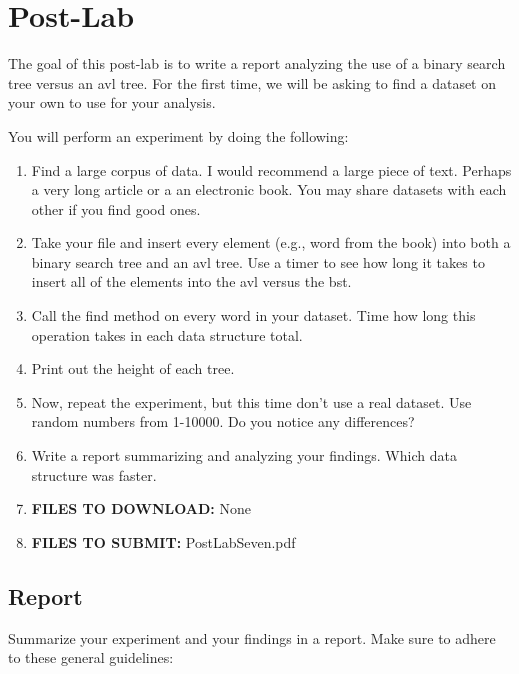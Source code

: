 \documentclass[paper=a4, fontsize=11pt, parskip=full]{scrartcl} %
\numberwithin{equation}{section} %
\numberwithin{figure}{section} %
\numberwithin{table}{section} %
\begin{document}
\newpage
\section{Post-Lab}

The goal of this post-lab is to write a report analyzing the use of a binary search tree versus an avl tree. For the first time, we will be asking to find a dataset on your own to use for your analysis. 

You will perform an experiment by doing the following:

\begin{enumerate}
	\item Find a large corpus of data. I would recommend a large piece of text. Perhaps a very long article or a an electronic book. You may share datasets with each other if you find good ones.
	\item Take your file and insert every element (e.g., word from the book) into both a binary search tree and an avl tree. Use a timer to see how long it takes to insert all of the elements into the avl versus the bst.
	\item Call the find method on every word in your dataset. Time how long this operation takes in each data structure total.
	\item Print out the height of each tree.
	\item Now, repeat the experiment, but this time don't use a real dataset. Use random numbers from 1-10000. Do you notice any differences?
	\item Write a report summarizing and analyzing your findings. Which data structure was faster.
	\item \textbf{FILES TO DOWNLOAD:} None
	\item \textbf{FILES TO SUBMIT:} PostLabSeven.pdf
\end{enumerate}

\subsection{Report}

Summarize your experiment and your findings in a report. Make sure to adhere to these general guidelines:
\end{document}
